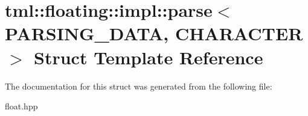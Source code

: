 \hypertarget{structtml_1_1floating_1_1impl_1_1parse}{\section{tml\+:\+:floating\+:\+:impl\+:\+:parse$<$ P\+A\+R\+S\+I\+N\+G\+\_\+\+D\+A\+T\+A, C\+H\+A\+R\+A\+C\+T\+E\+R $>$ Struct Template Reference}
\label{structtml_1_1floating_1_1impl_1_1parse}
}


The documentation for this struct was generated from the following file\+:\begin{DoxyCompactItemize}
\item 
float.\+hpp\end{DoxyCompactItemize}
